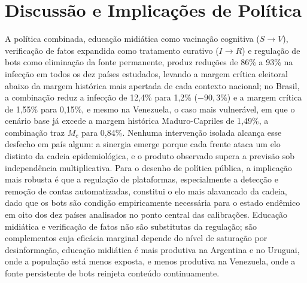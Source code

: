 \documentclass[12pt,a4paper]{article}
\theoremstyle{definition}
\theoremstyle{plain}
\begin{document}
\section{Discussão e Implicações de Política}
\label{sec:discussion}

A política combinada, educação midiática como vacinação cognitiva ($S \to V$), verificação de fatos expandida como tratamento curativo ($I \to R$) e regulação de bots como eliminação da fonte permanente, produz reduções de 86\% a 93\% na infecção em todos os dez países estudados, levando a margem crítica eleitoral abaixo da margem histórica mais apertada de cada contexto nacional; no Brasil, a combinação reduz a infecção de 12,4\% para 1,2\% ($-90{,}3\%$) e a margem crítica de 1,55\% para 0,15\%, e mesmo na Venezuela, o caso mais vulnerável, em que o cenário base já excede a margem histórica Maduro-Capriles de 1,49\%, a combinação traz $M_c$ para 0,84\%. Nenhuma intervenção isolada alcança esse desfecho em país algum: a sinergia emerge porque cada frente ataca um elo distinto da cadeia epidemiológica, e o produto observado supera a previsão sob independência multiplicativa. Para o desenho de política pública, a implicação mais robusta é que a regulação de plataformas, especialmente a detecção e remoção de contas automatizadas, constitui o elo mais alavancado da cadeia, dado que os bots são condição empiricamente necessária para o estado endêmico em oito dos dez países analisados no ponto central das calibrações. Educação midiática e verificação de fatos não são substitutas da regulação; são complementos cuja eficácia marginal depende do nível de saturação por desinformação, educação midiática é mais produtiva na Argentina e no Uruguai, onde a população está menos exposta, e menos produtiva na Venezuela, onde a fonte persistente de bots reinjeta conteúdo continuamente.
\end{document}
